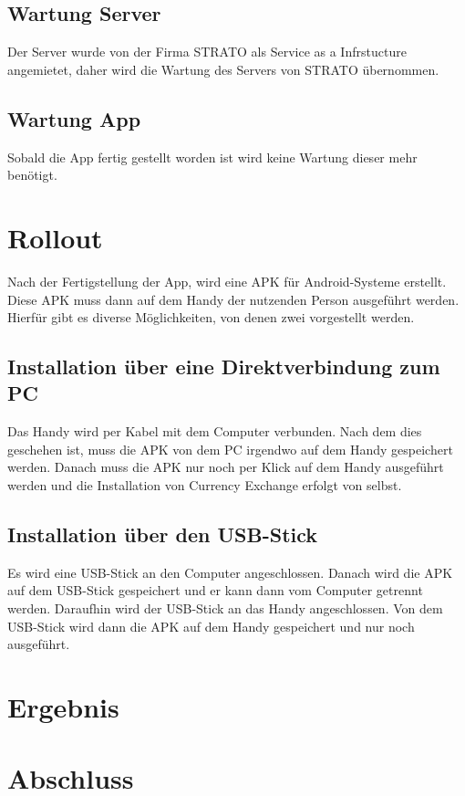 \documentclass[conference]{IEEEtran}
\begin{document}
\subsection{Wartung Server}
Der Server wurde von der Firma STRATO als Service as a Infrstucture angemietet, daher wird die Wartung des Servers von STRATO übernommen.

\subsection{Wartung App}
Sobald die App fertig gestellt worden ist wird keine Wartung dieser mehr benötigt.

\section{Rollout}
Nach der Fertigstellung der App, wird eine APK für Android-Systeme erstellt. Diese APK muss dann auf dem Handy der nutzenden Person ausgeführt werden. Hierfür gibt es diverse Möglichkeiten, von denen zwei vorgestellt werden. 

\subsection{Installation über eine Direktverbindung zum PC}
Das Handy wird per Kabel mit dem Computer verbunden. Nach dem dies geschehen ist, muss die APK von dem PC irgendwo auf dem Handy gespeichert werden. Danach muss die APK nur noch per Klick auf dem Handy ausgeführt werden und die Installation von Currency Exchange erfolgt von selbst.

\subsection{Installation über den USB-Stick}
Es wird eine USB-Stick an den Computer angeschlossen. Danach wird die APK auf dem USB-Stick gespeichert und er kann dann vom Computer getrennt werden. Daraufhin wird der USB-Stick an das Handy angeschlossen. Von dem USB-Stick wird dann die APK auf dem Handy gespeichert und nur noch ausgeführt. 

\section{Ergebnis}

\section{Abschluss}
\end{document}
